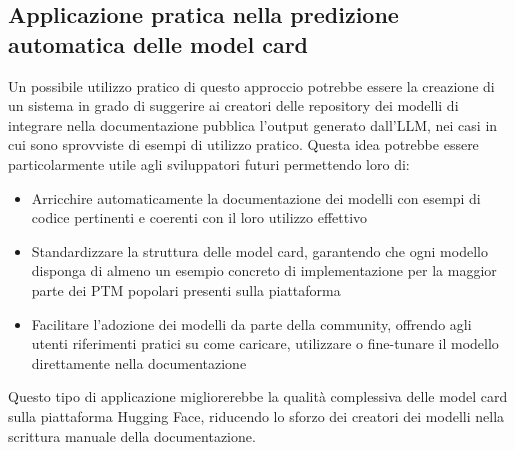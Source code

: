 \documentclass{article}
\begin{document}
\subsection{Applicazione pratica nella predizione automatica delle model card}
Un possibile utilizzo pratico di questo approccio potrebbe essere la creazione di un sistema in grado di suggerire ai creatori delle repository dei modelli di integrare nella documentazione pubblica l'output generato dall'LLM, nei casi in cui sono sprovviste di esempi di utilizzo pratico.
Questa idea potrebbe essere particolarmente utile agli sviluppatori futuri permettendo loro di:
\begin{itemize}
    \item Arricchire automaticamente la documentazione dei modelli con esempi di codice pertinenti e coerenti con il loro utilizzo effettivo
    \item Standardizzare la struttura delle model card, garantendo che ogni modello disponga di almeno un esempio concreto di implementazione per la maggior parte dei PTM popolari presenti sulla piattaforma
    \item Facilitare l’adozione dei modelli da parte della community, offrendo agli utenti riferimenti pratici su come caricare, utilizzare o fine-tunare il modello direttamente nella documentazione
\end{itemize}
Questo tipo di applicazione migliorerebbe la qualità complessiva delle model card sulla piattaforma Hugging Face, riducendo lo sforzo dei creatori dei modelli nella scrittura manuale della documentazione.



\appendix
\end{document}
